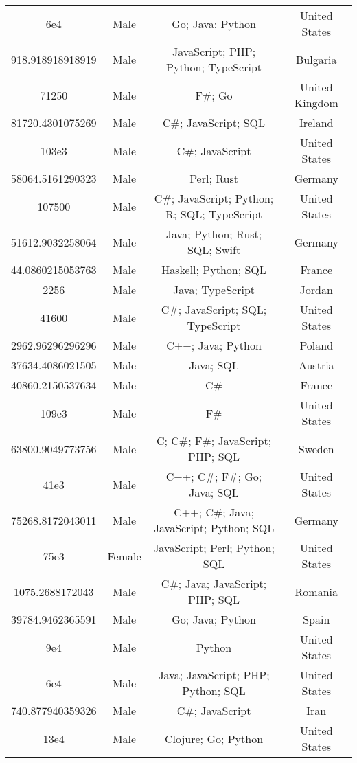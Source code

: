 \begin{center}
\begin{tabular}{ |c|c|c|c| }
6e4  &  Male  &  Go; Java; Python  &  United States  \\ 
918.918918918919  &  Male  &  JavaScript; PHP; Python; TypeScript  &  Bulgaria  \\ 
71250  &  Male  &  F\#; Go  &  United Kingdom  \\ 
81720.4301075269  &  Male  &  C\#; JavaScript; SQL  &  Ireland  \\ 
103e3  &  Male  &  C\#; JavaScript  &  United States  \\ 
58064.5161290323  &  Male  &  Perl; Rust  &  Germany  \\ 
107500  &  Male  &  C\#; JavaScript; Python; R; SQL; TypeScript  &  United States  \\ 
51612.9032258064  &  Male  &  Java; Python; Rust; SQL; Swift  &  Germany  \\ 
44.0860215053763  &  Male  &  Haskell; Python; SQL  &  France  \\ 
2256  &  Male  &  Java; TypeScript  &  Jordan  \\ 
41600  &  Male  &  C\#; JavaScript; SQL; TypeScript  &  United States  \\ 
2962.96296296296  &  Male  &  C++; Java; Python  &  Poland  \\ 
37634.4086021505  &  Male  &  Java; SQL  &  Austria  \\ 
40860.2150537634  &  Male  &  C\#  &  France  \\ 
109e3  &  Male  &  F\#  &  United States  \\ 
63800.9049773756  &  Male  &  C; C\#; F\#; JavaScript; PHP; SQL  &  Sweden  \\ 
41e3  &  Male  &  C++; C\#; F\#; Go; Java; SQL  &  United States  \\ 
75268.8172043011  &  Male  &  C++; C\#; Java; JavaScript; Python; SQL  &  Germany  \\ 
75e3  &  Female  &  JavaScript; Perl; Python; SQL  &  United States  \\ 
1075.2688172043  &  Male  &  C\#; Java; JavaScript; PHP; SQL  &  Romania  \\ 
39784.9462365591  &  Male  &  Go; Java; Python  &  Spain  \\ 
9e4  &  Male  &  Python  &  United States  \\ 
6e4  &  Male  &  Java; JavaScript; PHP; Python; SQL  &  United States  \\ 
740.877940359326  &  Male  &  C\#; JavaScript  &  Iran  \\ 
13e4  &  Male  &  Clojure; Go; Python  &  United States  \\ 

\end{tabular}
\end{center}
